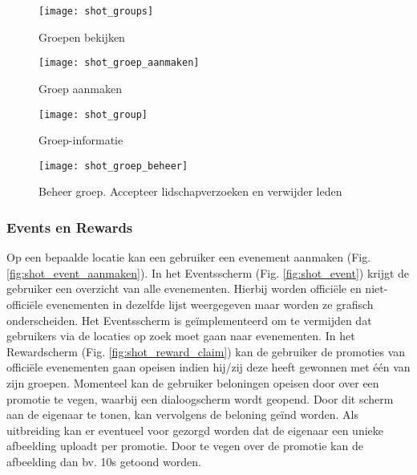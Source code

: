 \begin{figure}[ht]

\begin{minipage}[b]{0.25\linewidth}
\centering
\texttt{[image: shot\_groups]}
\caption{Groepen bekijken}
\label{fig:shot_groups}
\end{minipage}
\hspace{1cm}
\begin{minipage}[b]{0.25\linewidth}
\centering
\texttt{[image: shot\_groep\_aanmaken]}
\caption{Groep aanmaken}
\label{fig:shot_groep_aanmaken}
\end{minipage}
\hspace{1cm}
\begin{minipage}[b]{0.25\linewidth}
\centering
\texttt{[image: shot\_group]}
\caption{Groep-informatie}
\label{fig:shot_group}
\end{minipage}

\end{figure}

\begin{figure}[ht]
\centering
\begin{minipage}[b]{0.5\linewidth}
\centering
\texttt{[image: shot\_groep\_beheer]}
\caption{Beheer groep. Accepteer lidschapverzoeken en verwijder leden}
\label{fig:shot_groep_beheer}
\end{minipage}


\end{figure}

\clearpage

\subsubsection{Events en Rewards}%
Op een bepaalde locatie kan een gebruiker een evenement aanmaken (Fig. \ref{fig:shot_event_aanmaken}).
In het Eventsscherm (Fig. \ref{fig:shot_event}) krijgt de gebruiker een overzicht van alle evenementen. Hierbij worden officiële en niet-officiële evenementen in dezelfde lijst weergegeven maar worden ze grafisch onderscheiden. Het Eventsscherm is geïmplementeerd om te vermijden dat gebruikers via de locaties op zoek moet gaan naar evenementen.
In het Rewardscherm (Fig. \ref{fig:shot_reward_claim}) kan de gebruiker de promoties van officiële evenementen gaan opeisen indien hij/zij deze heeft gewonnen met één van zijn groepen. Momenteel kan de gebruiker beloningen opeisen door over een promotie te vegen, waarbij een dialoogscherm wordt geopend. Door dit scherm aan de eigenaar te tonen, kan vervolgens de beloning geïnd worden. Als uitbreiding kan er eventueel voor gezorgd worden dat de eigenaar een unieke afbeelding uploadt per promotie. Door te vegen over de promotie kan de afbeelding dan bv. 10s getoond worden.
